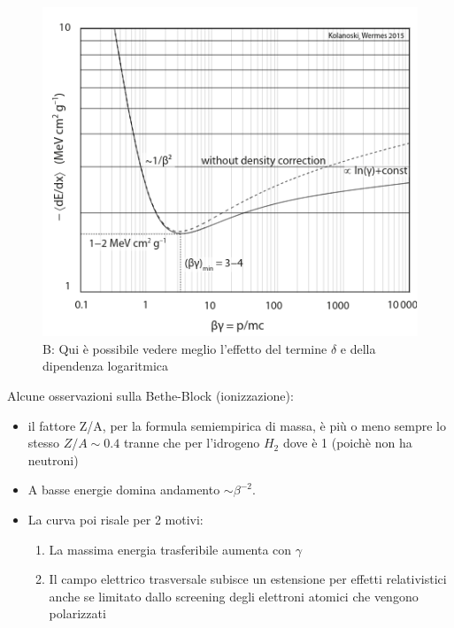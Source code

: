 \begin{minipage}{0.48\textwidth}

\begin{figure}[H]
    \centering
    \includegraphics[width=\textwidth,frame]{Chapters/images/Interazione_radiazione_materia/image-20220214175429234.png}
    \captionsetup{width=\textwidth}
    \caption{B: Qui è possibile vedere meglio l'effetto del termine $\delta$ e della dipendenza logaritmica}
    \label{fig:}
\end{figure}

\end{minipage}
Alcune osservazioni sulla Bethe-Block (ionizzazione):
\begin{itemize}
    \item il fattore Z/A, per la formula semiempirica di massa, è più o meno sempre lo stesso $Z/A\sim 0.4$ tranne che per l'idrogeno $H_2$ dove è 1 (poichè non ha neutroni)
    \item A basse energie domina andamento $\sim \beta^{-2}$.
    \item La curva poi risale per 2 motivi:
    \begin{enumerate}
        \item La massima energia trasferibile aumenta con $ \gamma$ 
        \item Il campo elettrico trasversale subisce un estensione per effetti relativistici anche se limitato dallo screening degli elettroni atomici che vengono polarizzati 
    \end{enumerate}
\end{itemize}

